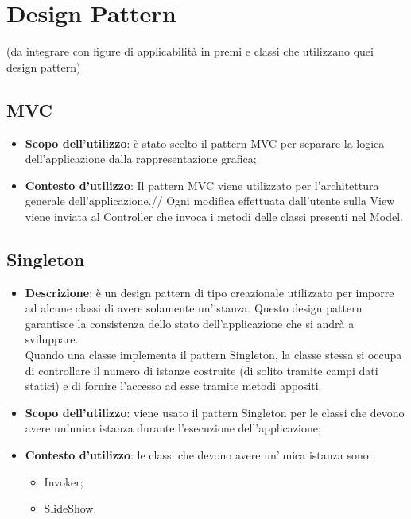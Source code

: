 \section{Design Pattern}{
	(da integrare con figure di applicabilità in premi e classi che utilizzano quei design pattern)
	\begin{figure}
	\end{figure}
	\subsection{MVC}{
			\begin{itemize}
				\item \textbf{Scopo dell’utilizzo}: è stato scelto il pattern MVC per separare la logica dell'applicazione dalla rappresentazione grafica;
				\item \textbf{Contesto d’utilizzo}: Il pattern MVC viene utilizzato per l'architettura generale dell'applicazione.//
				Ogni modifica effettuata dall'utente sulla View viene inviata al Controller che invoca i metodi delle classi presenti nel Model.
			\end{itemize}
		}
		
	\subsection{Singleton}{
		\begin{itemize}
			\item \textbf{Descrizione}: è un design pattern di tipo creazionale utilizzato per imporre ad alcune classi di avere solamente un'istanza. Questo design pattern garantisce la consistenza dello stato dell'applicazione che si andrà a sviluppare.\\
			Quando una classe implementa il pattern Singleton, la classe stessa si occupa di controllare il numero di istanze costruite (di solito tramite campi dati statici) e di fornire l'accesso ad esse tramite metodi appositi.\\
			\item \textbf{Scopo dell’utilizzo}: viene usato il pattern Singleton per le classi che devono avere un'unica istanza durante l'esecuzione dell'applicazione;
			\item \textbf{Contesto d’utilizzo}: le classi che devono avere un’unica istanza sono:
			\begin{itemize}
				\item Invoker;
				\item SlideShow.
			\end{itemize}
			\end{itemize}
}}
